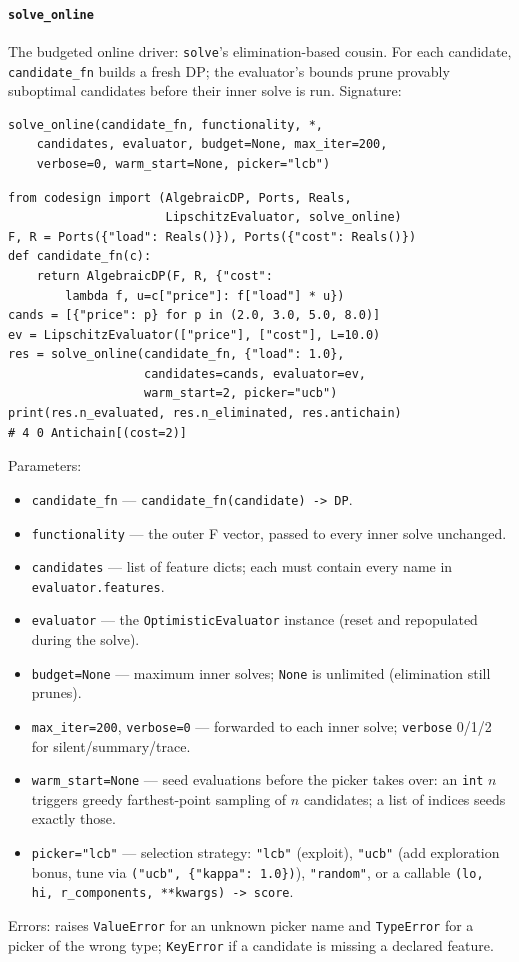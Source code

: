 \documentclass[11pt,a4paper]{article}
\begin{document}
\paragraph{\texttt{solve\_online}}\label{ref:online:solve_online}
The budgeted online driver: \texttt{solve}'s elimination-based cousin. For
each candidate, \texttt{candidate\_fn} builds a fresh DP; the evaluator's
bounds prune provably suboptimal candidates before their inner solve is run.
Signature:
\begin{lstlisting}
solve_online(candidate_fn, functionality, *,
    candidates, evaluator, budget=None, max_iter=200,
    verbose=0, warm_start=None, picker="lcb")
\end{lstlisting}
\begin{lstlisting}
from codesign import (AlgebraicDP, Ports, Reals,
                      LipschitzEvaluator, solve_online)
F, R = Ports({"load": Reals()}), Ports({"cost": Reals()})
def candidate_fn(c):
    return AlgebraicDP(F, R, {"cost":
        lambda f, u=c["price"]: f["load"] * u})
cands = [{"price": p} for p in (2.0, 3.0, 5.0, 8.0)]
ev = LipschitzEvaluator(["price"], ["cost"], L=10.0)
res = solve_online(candidate_fn, {"load": 1.0},
                   candidates=cands, evaluator=ev,
                   warm_start=2, picker="ucb")
print(res.n_evaluated, res.n_eliminated, res.antichain)
# 4 0 Antichain[(cost=2)]
\end{lstlisting}
Parameters:
\begin{itemize}[nosep]
  \item \texttt{candidate\_fn} --- \texttt{candidate\_fn(candidate) -> DP}.
  \item \texttt{functionality} --- the outer F vector, passed to every inner
    solve unchanged.
  \item \texttt{candidates} --- list of feature dicts; each must contain
    every name in \texttt{evaluator.features}.
  \item \texttt{evaluator} --- the \texttt{OptimisticEvaluator} instance
    (reset and repopulated during the solve).
  \item \texttt{budget=None} --- maximum inner solves; \texttt{None} is
    unlimited (elimination still prunes).
  \item \texttt{max\_iter=200}, \texttt{verbose=0} --- forwarded to each
    inner solve; \texttt{verbose} 0/1/2 for silent/summary/trace.
  \item \texttt{warm\_start=None} --- seed evaluations before the picker
    takes over: an \texttt{int} $n$ triggers greedy farthest-point sampling
    of $n$ candidates; a list of indices seeds exactly those.
  \item \texttt{picker="lcb"} --- selection strategy: \texttt{"lcb"}
    (exploit), \texttt{"ucb"} (add exploration bonus, tune via
    \texttt{("ucb", \{"kappa": 1.0\})}), \texttt{"random"}, or a callable
    \texttt{(lo, hi, r\_components, **kwargs) -> score}.
\end{itemize}
Errors: raises \texttt{ValueError} for an unknown picker name and
\texttt{TypeError} for a picker of the wrong type; \texttt{KeyError} if a
candidate is missing a declared feature.
\end{document}
